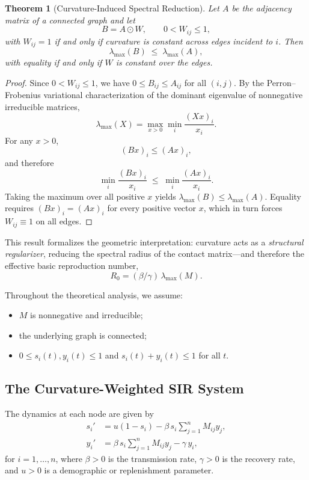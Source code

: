 \documentclass[final,3p,times,twocolumn]{elsarticle}
\newtheorem{theorem}{Theorem}
\begin{document}
\begin{theorem}[Curvature-Induced Spectral Reduction]
\label{thm:spectral-reduction}
Let $A$ be the adjacency matrix of a connected graph and let
\[
    B = A \odot W,\qquad 0 < W_{ij} \le 1,
\]
with $W_{ij}=1$ if and only if curvature is constant across edges incident to $i$.  
Then
\[
    \lambda_{\max}(B)
    \;\le\;
    \lambda_{\max}(A),
\]
with equality if and only if $W$ is constant over the edges.
\end{theorem}

\begin{proof}
Since $0 < W_{ij} \le 1$, we have $0 \le B_{ij} \le A_{ij}$ for all $(i,j)$.  
By the Perron--Frobenius variational characterization of the dominant eigenvalue of nonnegative irreducible matrices,
\[
    \lambda_{\max}(X)
    =
    \max_{x>0}
    \min_{i}
    \frac{(Xx)_i}{x_i}.
\]
For any $x>0$,
\[
    (Bx)_i \le (Ax)_i,
\]
and therefore
\[
    \min_i \frac{(Bx)_i}{x_i}
    \;\le\;
    \min_i \frac{(Ax)_i}{x_i}.
\]
Taking the maximum over all positive $x$ yields  
$\lambda_{\max}(B) \le \lambda_{\max}(A)$.  
Equality requires $(Bx)_i=(Ax)_i$ for every positive vector $x$, which in turn forces $W_{ij}\equiv 1$ on all edges.
\end{proof}

\medskip

This result formalizes the geometric interpretation: curvature acts as a \emph{structural regularizer}, reducing the spectral radius of the contact matrix—and therefore the effective basic reproduction number,
\[
    R_0 = (\beta/\gamma)\,\lambda_{\max}(M).
\]

\medskip

Throughout the theoretical analysis, we assume:

\begin{itemize}[label=--]
    \item[(H1)] $M$ is nonnegative and irreducible;
    \item[(H2)] the underlying graph is connected;
    \item[(H3)] $0 \le s_i(t), y_i(t) \le 1$ and $s_i(t)+y_i(t)\le 1$ for all $t$.
\end{itemize}

\subsection{The Curvature-Weighted SIR System}

The dynamics at each node are given by
\begin{equation}
\label{eq:model}
\begin{aligned}
    s_i' &= u(1 - s_i) - \beta\, s_i \sum_{j=1}^n M_{ij} y_j, \\
    y_i' &= \beta\, s_i \sum_{j=1}^n M_{ij} y_j - \gamma\, y_i,
\end{aligned}
\end{equation}
for $i=1,\dots,n$, where $\beta>0$ is the transmission rate, $\gamma>0$ is the
recovery rate, and $u>0$ is a demographic or replenishment parameter.
\end{document}
